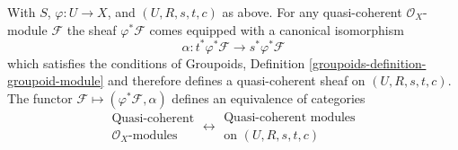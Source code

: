 \begin{proposition}
\label{proposition-quasi-coherent}
With $S$, $\varphi : U \to X$, and $(U, R, s, t, c)$ as above.
For any quasi-coherent $\mathcal{O}_X$-module $\mathcal{F}$ the
sheaf $\varphi^*\mathcal{F}$ comes equipped with a canonical
isomorphism
$$
\alpha : t^*\varphi^*\mathcal{F} \longrightarrow s^*\varphi^*\mathcal{F}
$$
which satisfies the conditions of
Groupoids, Definition \ref{groupoids-definition-groupoid-module}
and therefore defines a quasi-coherent sheaf on $(U, R, s, t, c)$.
The functor $\mathcal{F} \mapsto (\varphi^*\mathcal{F}, \alpha)$
defines an equivalence of categories
$$
\begin{matrix}
\text{Quasi-coherent} \\
\mathcal{O}_X\text{-modules}
\end{matrix}
\longleftrightarrow
\begin{matrix}
\text{Quasi-coherent modules}\\
\text{on }(U, R, s, t, c)
\end{matrix}
$$
\end{proposition}

